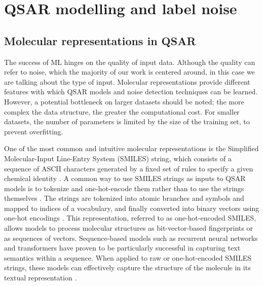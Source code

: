 \pagebreak
\chapter{QSAR modelling and label noise}\label{chap:background}\label{sec2}

\section{Molecular representations in QSAR}

The success of ML hinges on the quality of input data. Although the quality can refer to noise, which the majority of our work is centered around, in this case we are talking about the type of input. Molecular representations provide different features with which QSAR models and noise detection techniques can be learned. However, a potential bottleneck on larger datasets should be noted; the more complex the data structure, the greater the computational cost. For smaller datasets, the number of parameters is limited by the size of the training set, to prevent overfitting.

One of the most common and intuitive molecular representations is the Simplified Molecular-Input Line-Entry System (SMILES) string, which consists of a sequence of ASCII characters generated by a fixed set of rules to specify a given chemical identity \citep{Weininger1988}. A common way to use SMILES strings as inputs to QSAR models is to tokenize and one-hot-encode them rather than to use the strings themselves \citep{TeachOpenCADD2023}. The strings are tokenized into atomic branches and symbols and mapped to indices of a vocabulary, and finally converted into binary vectors using one-hot encodings \citep{TeachOpenCADD2023}. This representation, referred to as one-hot-encoded SMILES, allows models to process molecular structures as bit-vector-based fingerprints or as sequences of vectors. Sequence-based models such as recurrent neural networks and transformers have proven to be particularly successful in capturing text semantics within a sequence. When applied to raw or one-hot-encoded SMILES strings, these models can effectively capture the structure of the molecule in its textual representation \citep{TeachOpenCADD2023}. 

